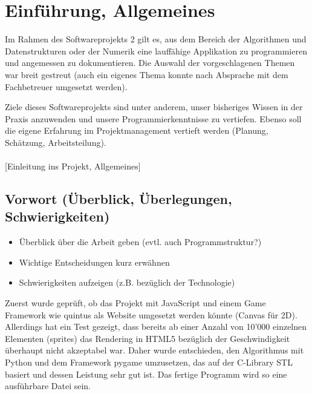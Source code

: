 
\chapter{Einführung, Allgemeines}

Im Rahmen des Softwareprojekts 2 gilt es, aus dem Bereich der Algorithmen und Datenstrukturen oder der Numerik eine lauffähige Applikation zu programmieren und angemessen zu dokumentieren. Die Auswahl der vorgeschlagenen Themen war breit gestreut (auch ein eigenes Thema konnte nach Absprache mit dem Fachbetreuer umgesetzt werden).

Ziele dieses Softwareprojekts sind unter anderem, unser bisheriges Wissen in der Praxis anzuwenden und unsere Programmierkenntnisse zu vertiefen. Ebenso soll die eigene Erfahrung im   Projektmanagement vertieft werden (Planung, Schätzung, Arbeitsteilung). \\\\





[Einleitung ins Projekt, Allgemeines]

\vspace*{1cm}




\section{Vorwort (Überblick, Überlegungen, Schwierigkeiten)}

\begin{itemize}[noitemsep]
\item Überblick über die Arbeit geben (evtl. auch Programmstruktur?)
\item Wichtige Entscheidungen kurz erwähnen
\item Schwierigkeiten aufzeigen (z.B. bezüglich der Technologie)
\end{itemize}


Zuerst wurde geprüft, ob das Projekt mit JavaScript und einem Game Framework wie quintus als Website umgesetzt werden könnte (Canvas für 2D). Allerdings hat ein Test gezeigt, dass bereits ab einer Anzahl von 10'000 einzelnen Elementen (sprites) das Rendering in HTML5 bezüglich der Geschwindigkeit überhaupt nicht akzeptabel war. Daher wurde entschieden, den Algorithmus mit Python und dem Framework pygame umzusetzen, das auf der C-Library STL basiert und dessen Leistung sehr gut ist. Das fertige Programm wird so eine ausführbare Datei sein.

